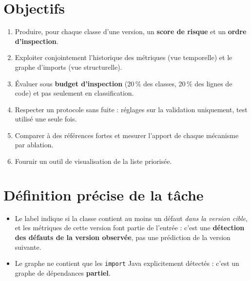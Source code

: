 \documentclass[11pt,a4paper,openany]{report}
\newcommand{\code}[1]{\texttt{\small #1}}
\begin{document}
\section{Objectifs}
\begin{enumerate}
  \item Produire, pour chaque classe d'une version, un \textbf{score de risque} et un \textbf{ordre d'inspection}.
  \item Exploiter conjointement l'historique des métriques (vue temporelle) et le graphe d'imports (vue structurelle).
  \item Évaluer sous \textbf{budget d'inspection} (20\,\% des classes, 20\,\% des lignes de code) et pas seulement
        en classification.
  \item Respecter un protocole sans fuite : réglages sur la validation uniquement, test utilisé une seule fois.
  \item Comparer à des références fortes et mesurer l'apport de chaque mécanisme par ablation.
  \item Fournir un outil de visualisation de la liste priorisée.
\end{enumerate}

\section{Définition précise de la tâche}
\begin{warnbox}
\begin{itemize}[leftmargin=1em]
  \item Le label indique si la classe contient au moins un défaut \emph{dans la version cible}, et les métriques
        de cette version font partie de l'entrée : c'est une \textbf{détection des défauts de la version observée},
        pas une prédiction de la version suivante.
  \item Le graphe ne contient que les \code{import} Java explicitement détectés : c'est un graphe de dépendances
        \textbf{partiel}.
\end{itemize}
\end{warnbox}
\end{document}
